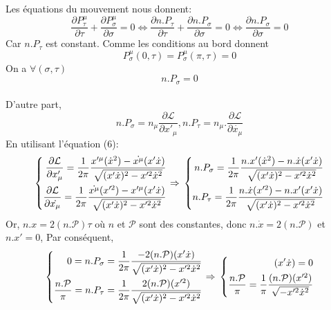 \documentclass[a4paper,12pt]{article}
\def\xmu{x^\mu}
\def\CL{\mathcal{L}}
\begin{document}
Les équations du mouvement nous donnent:
$$\frac{\partial P^{\mu}_{\tau}}{\partial \tau}+\frac{\partial P^{\mu}_{\sigma}}{\partial \sigma}=0 \Leftrightarrow \frac{\partial n.P_{\tau}}{\partial \tau}+\frac{\partial n.P_{\sigma}}{\partial \sigma}=0 \Leftrightarrow \frac{\partial n.P_{\sigma}}{\partial \sigma}=0$$
Car $n.P_\tau$ est constant.
Comme les conditions au bord donnent
$$P_\sigma^\mu(0,\tau)=P_\sigma^\mu(\pi,\tau)=0$$
On a $\forall (\sigma,\tau)$ $$n.P_\sigma=0 $$\\
D'autre part, 
$$n.P_\sigma=n_\mu \frac{\partial \CL}{\partial x'_\mu }, n.P_\tau=n_\mu.\frac{\partial \CL}{\partial \dot{x_\mu}}$$
En utilisant l'équation (6):
\begin{equation}
	\left\lbrace
	\begin{aligned}
	\frac{\partial \CL}{\partial x'_\mu }=\frac{1}{2\pi}\frac{x'^\mu (\dot{x}^2)-\dot{\xmu}(x'\dot{x})}{\sqrt{(x'\dot{x})^2-x'^2\dot{x}^2}}\\
	\frac{\partial \CL}{\partial \dot{x_\mu}}=\frac{1}{2\pi}\frac{\dot{\xmu} (x'^2)-x'^\mu(x'\dot{x})}{\sqrt{(x'\dot{x})^2-x'^2\dot{x}^2}}\\
	\end{aligned}
	\right.
	\Rightarrow\\
	\left\lbrace
	\begin{aligned}
	n.P_\sigma=\frac{1}{2\pi}\frac{n.x' (\dot{x}^2)-n.\dot{x}(x'\dot{x})}{\sqrt{(x'\dot{x})^2-x'^2\dot{x}^2}}\\
	n.P_\tau=\frac{1}{2\pi}\frac{n.\dot{x} (x'^2)-n.x'(x'\dot{x})}{\sqrt{(x'\dot{x})^2-x'^2\dot{x}^2}}
	\end{aligned}
	\right.
\end{equation}
Or, $n.x=2(n.\mathcal{P})\tau$ où $n$ et $\mathcal{P}$ sont des constantes,
donc $n.\dot{x}=2(n.\mathcal{P})$ et $n.x'=0$,
Par conséquent, 
\begin{equation}
	\left\lbrace
	\begin{aligned}
	0=n.P_\sigma=\frac{1}{2\pi}\frac{-2(n.\mathcal{P})(x'\dot{x})}{\sqrt{(x'\dot{x})^2-x'^2\dot{x}^2}}\\
	\frac{n.\mathcal{P}}{\pi}=n.P_\tau=\frac{1}{2\pi}\frac{2(n.\mathcal{P}) (x'^2)}{\sqrt{(x'\dot{x})^2-x'^2\dot{x}^2}}
	\end{aligned}
	\right.
	\Rightarrow\\
	\left\lbrace
	\begin{aligned}
	(x'\dot{x})=0\\
	\frac{n.\mathcal{P}}{\pi}=\frac{1}{\pi}\frac{(n.\mathcal{P}) (x'^2)}{\sqrt{-x'^2\dot{x}^2}}
	\end{aligned}
	\right.	
\end{equation}
\end{document}
